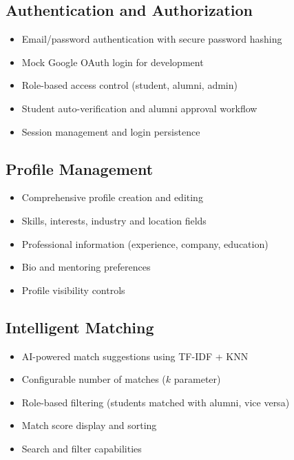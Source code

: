 \documentclass[12pt,a4paper]{report}
\let\origsubsection\subsection
\renewcommand{\subsection}{\needspace{4\baselineskip}\origsubsection}
\begin{document}
\subsection{Authentication and Authorization}

\begin{itemize}[noitemsep]
    \item Email/password authentication with secure password hashing
    \item Mock Google OAuth login for development
    \item Role-based access control (student, alumni, admin)
    \item Student auto-verification and alumni approval workflow
    \item Session management and login persistence
\end{itemize}

\subsection{Profile Management}

\begin{itemize}[noitemsep]
    \item Comprehensive profile creation and editing
    \item Skills, interests, industry and location fields
    \item Professional information (experience, company, education)
    \item Bio and mentoring preferences
    \item Profile visibility controls
\end{itemize}

\subsection{Intelligent Matching}

\begin{itemize}[noitemsep]
    \item AI-powered match suggestions using TF-IDF + KNN
    \item Configurable number of matches ($k$ parameter)
    \item Role-based filtering (students matched with alumni, vice versa)
    \item Match score display and sorting
    \item Search and filter capabilities
\end{itemize}
\end{document}
